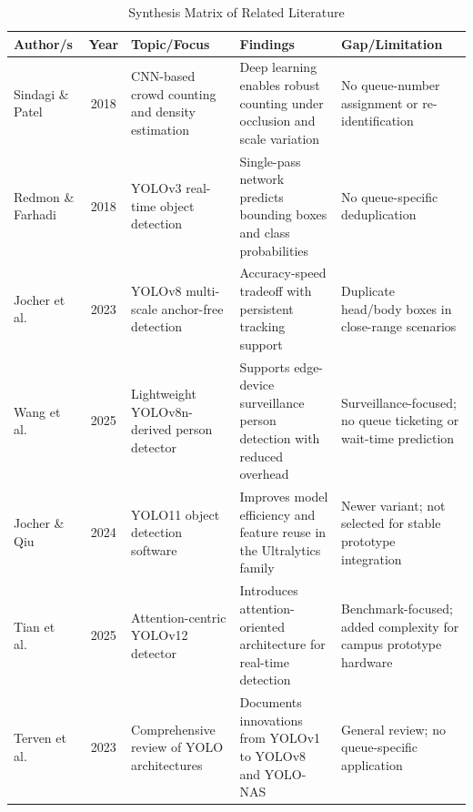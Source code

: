 \documentclass{research}
\begin{document}
\begin{table}[H]
  \caption{Synthesis Matrix of Related Literature}
  \label{tab:synthesis}
  \centering
  \scriptsize
  \setlength{\tabcolsep}{3pt}
  \renewcommand{\arraystretch}{1.02}
  \begin{tabular}{p{2.7cm} c p{3.0cm} p{3.3cm} p{3.7cm}}
    \toprule
    \textbf{Author/s} & \textbf{Year} & \textbf{Topic/Focus} &
    \textbf{Findings} & \textbf{Gap/Limitation} \\
    \midrule
    Sindagi \& Patel~\cite{sindagi2018survey} & 2018 &
      CNN-based crowd counting and density estimation &
      Deep learning enables robust counting under occlusion and scale variation &
      No queue-number assignment or re-identification \\[0.3em]
    Redmon \& Farhadi~\cite{redmon2018} & 2018 &
      YOLOv3 real-time object detection &
      Single-pass network predicts bounding boxes and class probabilities &
      No queue-specific deduplication \\[0.3em]
    Jocher et al.~\cite{jocher2023} & 2023 &
      YOLOv8 multi-scale anchor-free detection &
      Accuracy-speed tradeoff with persistent tracking support &
      Duplicate head/body boxes in close-range scenarios \\[0.3em]
    Wang et al.~\cite{wang2025lightweight} & 2025 &
      Lightweight YOLOv8n-derived person detector &
      Supports edge-device surveillance person detection with reduced overhead &
      Surveillance-focused; no queue ticketing or wait-time prediction \\[0.3em]
    Jocher \& Qiu~\cite{jocher2024yolo11} & 2024 &
      YOLO11 object detection software &
      Improves model efficiency and feature reuse in the Ultralytics family &
      Newer variant; not selected for stable prototype integration \\[0.3em]
    Tian et al.~\cite{tian2025yolov12} & 2025 &
      Attention-centric YOLOv12 detector &
      Introduces attention-oriented architecture for real-time detection &
      Benchmark-focused; added complexity for campus prototype hardware \\[0.3em]
    Terven et al.~\cite{terven2023yolo} & 2023 &
      Comprehensive review of YOLO architectures &
      Documents innovations from YOLOv1 to YOLOv8 and YOLO-NAS &
      General review; no queue-specific application \\[0.3em]
\bottomrule
  \end{tabular}
\end{table}
\end{document}
